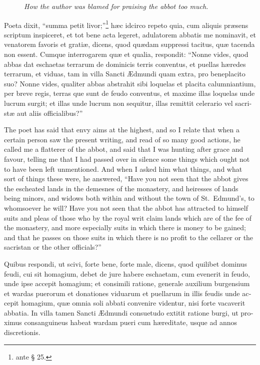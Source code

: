 \documentclass{book}
\newcommand{\blockhead}[4][]{
\begin{figure}
\centering
\vspace{#4}
\parbox{2.75cm}{\begin{center}\footnotesize \color{BrickRed} \emph{#2}\\ #1 \end{center}}
\end{figure}
}
\begin{document}
\begin{paracol}{2}
\switchcolumn*

\clearpage

\begin{otherlanguage}{latin}
\blockhead{How the author was blamed for praising the abbot too much.}{4}{-.1cm}
Poeta dixit, ``summa petit livor;''\footnote[\textdagger]{ante \S{} 25.} h\ae{}c idcirco repeto quia, cum aliquis pr\ae{}sens scriptum inspiceret, et tot bene acta legeret, adulatorem abbatis me nominavit, et venatorem favoris et grati\ae{}, dicens, quod qu\ae{}dam suppressi tacitus, qu\ae{} tacenda non essent. Cumque interrogarem qu\ae{} et qualia, respondit: ``Nonne vides, quod abbas dat eschaetas terrarum de dominicis terris conventus, et puellas h\ae{}redes terrarum, et viduas, tam in villa Sancti \AE{}dmundi quam extra, pro beneplacito suo? Nonne vides, qualiter abbas abstrahit sibi loquelas et placita calumniantium, per breve regis, terras que sunt de feudo conventus, et maxime illas loquelas unde lucrum surgit; et illas unde lucrum non sequitur, illas remittit celerario vel sacrist\ae{} aut aliis officialibus?''

\end{otherlanguage}

\switchcolumn

The poet has said that envy aims at the highest, and so I relate that when a certain person saw the present writing, and read of so many good actions, he called me a flatterer of the abbot, and said that I was hunting after grace and favour, telling me that I had passed over in silence some things which ought not to have been left unmentioned. And when I asked him what things, and what sort of things these were, he answered, ``Have you not seen that the abbot gives the escheated lands in the demesnes of the monastery, and heiresses of lands being minors, and widows both within and without the town of St.\ Edmund's, to whomsoever he will? Have you not seen that the abbot has attracted to himself suits and pleas of those who by the royal writ claim lands which are of the fee of the monastery, and more especially suits in which there is money to be gained; and that he passes on those suits in which there is no profit to the cellarer or the sacristan or the other officials?''

\switchcolumn*

\begin{otherlanguage}{latin}
Quibus respondi, ut scivi, forte bene, forte male, dicens, quod quilibet dominus feudi, cui sit homagium, debet de jure habere eschaetam, cum evenerit in feudo, unde ipse accepit homagium; et consimili ratione, generale auxilium burgensium et wardas puerorum et donationes viduarum et puellarum in illis feudis unde accepit homagium, qu\ae{} omnia soli abbati convenire videntur, nisi forte vacaverit abbatia. In villa tamen Sancti \AE{}dmundi consuetudo extitit ratione burgi, ut proximus consanguineus habeat wardam pueri cum h\ae{}reditate, usque ad annos discretionis.
\end{otherlanguage}


\end{paracol}
\end{document}
